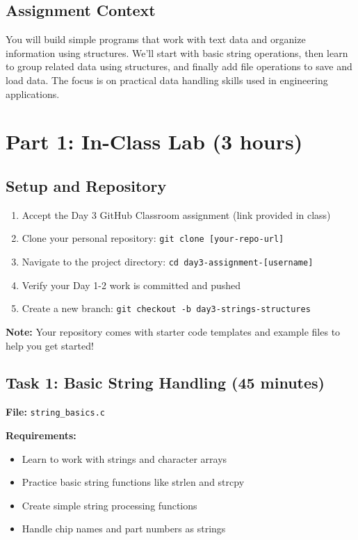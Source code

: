 \documentclass[11pt,a4paper]{article}
\begin{document}
\subsection{Assignment Context}
You will build simple programs that work with text data and organize information using structures. We'll start with basic string operations, then learn to group related data using structures, and finally add file operations to save and load data. The focus is on practical data handling skills used in engineering applications.

\section{Part 1: In-Class Lab (3 hours)}

\subsection{Setup and Repository}
\begin{enumerate}
    \item Accept the Day 3 GitHub Classroom assignment (link provided in class)
    \item Clone your personal repository: \texttt{git clone [your-repo-url]}
    \item Navigate to the project directory: \texttt{cd day3-assignment-[username]}
    \item Verify your Day 1-2 work is committed and pushed
    \item Create a new branch: \texttt{git checkout -b day3-strings-structures}
\end{enumerate}

\textbf{Note:} Your repository comes with starter code templates and example files to help you get started!

\subsection{Task 1: Basic String Handling (45 minutes)}

\textbf{File:} \texttt{string\_basics.c}

\textbf{Requirements:}
\begin{itemize}
    \item Learn to work with strings and character arrays
    \item Practice basic string functions like strlen and strcpy
    \item Create simple string processing functions
    \item Handle chip names and part numbers as strings
\end{itemize}
\end{document}
